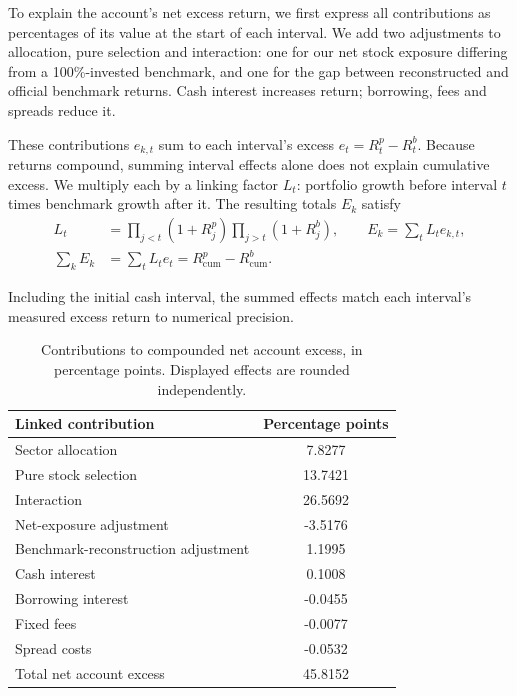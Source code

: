 To explain the account's net excess return, we first express all contributions
as percentages of its value at the start of each interval. We add two
adjustments to allocation, pure selection and interaction: one for our net stock exposure
differing from a 100\%-invested benchmark, and one for the gap between
reconstructed and official benchmark returns. Cash interest increases return;
borrowing, fees and spreads reduce it.

\begin{samepage}
These contributions $e_{k,t}$ sum to each interval's excess
$e_t=R^p_t-R^b_t$. Because returns compound, summing interval effects alone
does not explain cumulative excess. We multiply each by a linking factor
$L_t$: portfolio growth before interval $t$ times benchmark growth after it.
The resulting totals $E_k$ satisfy
\begin{equation}
 \begin{aligned}
 L_t&=\prod_{j<t}(1+R^p_j)\prod_{j>t}(1+R^b_j),
 \qquad E_k=\sum_t L_t e_{k,t},\\
 \sum_k E_k&=\sum_t L_t e_t=R^p_{\mathrm{cum}}-R^b_{\mathrm{cum}}.
 \end{aligned}
\end{equation}
\end{samepage}

Including the initial cash interval, the summed effects match each interval's
measured excess return to numerical precision.

\begin{table}[H]
  \centering
  \begin{threeparttable}
  \small
  \begin{tabularx}{0.82\linewidth}{@{}X S[table-format=-2.4]@{}}
    \toprule
    Linked contribution & {Percentage points} \\
    \midrule
    Sector allocation & 7.8277 \\
    Pure stock selection & 13.7421 \\
    Interaction & 26.5692 \\
    Net-exposure adjustment & -3.5176 \\
    Benchmark-reconstruction adjustment & 1.1995 \\
    Cash interest & 0.1008 \\
    Borrowing interest & -0.0455 \\
    Fixed fees & -0.0077 \\
    Spread costs & -0.0532 \\
    \midrule
    Total net account excess & 45.8152 \\
    \bottomrule
  \end{tabularx}
  \caption[Linked contributions to net account excess return]{Contributions to compounded net account excess, in percentage points. Displayed effects are rounded independently.}
  \label{tab:account-attribution}
  \end{threeparttable}
\end{table}


